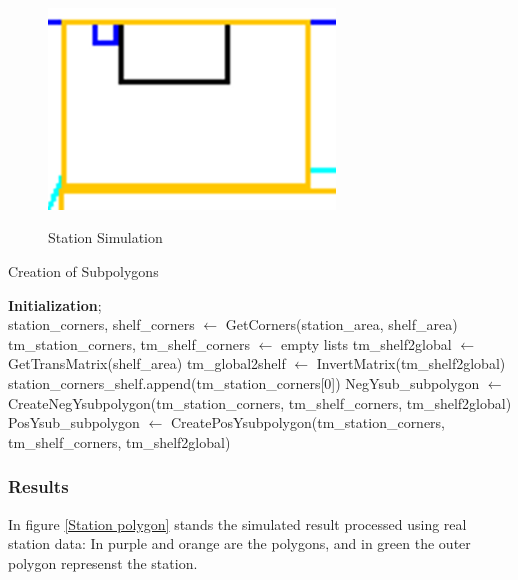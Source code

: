 \begin{figure}[H]
    \begin{center}
        \includegraphics[width=3in]{images/Chap2/station.png}\\
        \caption{Station Simulation}
        \label{Station}
        \end{center}    
\end{figure}


\noindent

\begin{algorithm}
\caption{Creation of Subpolygons}\label{alg:createSubpolygons}
\BlankLine
\textbf{Initialization}; \\
station\_corners, shelf\_corners $\gets$ GetCorners(station\_area, shelf\_area)\;
tm\_station\_corners, tm\_shelf\_corners $\gets$ empty lists\;
tm\_shelf2global $\gets$ GetTransMatrix(shelf\_area)\;
tm\_global2shelf $\gets$ InvertMatrix(tm\_shelf2global)\;
station\_corners\_shelf.append(tm\_station\_corners[0])\;
NegYsub\_subpolygon $\gets$ CreateNegYsubpolygon(tm\_station\_corners, tm\_shelf\_corners, tm\_shelf2global)\;
PosYsub\_subpolygon $\gets$ CreatePosYsubpolygon(tm\_station\_corners, tm\_shelf\_corners, tm\_shelf2global)\;
\;
\end{algorithm}
\noindent



\subsubsection{Results}

In figure \ref{Station polygon} stands the simulated result processed using real station data: In purple and orange are 
the polygons, and in green the outer polygon represenst the station.

